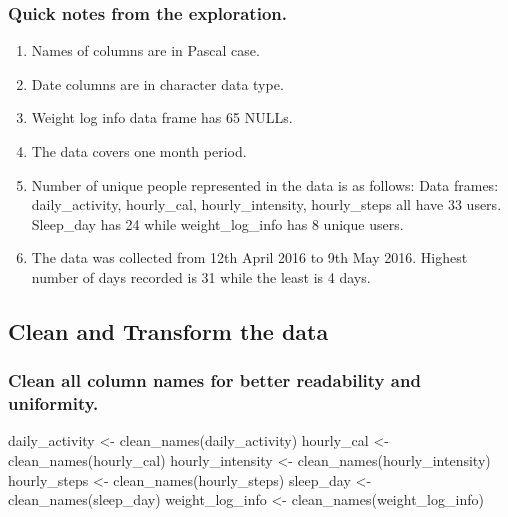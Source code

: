 \documentclass[
]{article}
\newenvironment{Shaded}{\begin{snugshade}}{\end{snugshade}}
\newcommand{\FunctionTok}[1]{\textcolor[rgb]{0.00,0.00,0.00}{#1}}
\newcommand{\NormalTok}[1]{#1}
\newcommand{\OtherTok}[1]{\textcolor[rgb]{0.56,0.35,0.01}{#1}}
\begin{document}
\hypertarget{quick-notes-from-the-exploration.}{%
\subsubsection{Quick notes from the
exploration.}\label{quick-notes-from-the-exploration.}}

\begin{enumerate}
\def\labelenumi{\arabic{enumi}.}
\item
  Names of columns are in Pascal case.
\item
  Date columns are in character data type.
\item
  Weight log info data frame has 65 NULLs.
\item
  The data covers one month period.
\item
  Number of unique people represented in the data is as follows: Data
  frames: daily\_activity, hourly\_cal, hourly\_intensity, hourly\_steps
  all have 33 users. Sleep\_day has 24 while weight\_log\_info has 8
  unique users.
\item
  The data was collected from 12th April 2016 to 9th May 2016. Highest
  number of days recorded is 31 while the least is 4 days.
\end{enumerate}

\hypertarget{clean-and-transform-the-data}{%
\subsection{Clean and Transform the
data}\label{clean-and-transform-the-data}}

\hypertarget{clean-all-column-names-for-better-readability-and-uniformity.}{%
\subsubsection{Clean all column names for better readability and
uniformity.}\label{clean-all-column-names-for-better-readability-and-uniformity.}}

\begin{Shaded}
\begin{Highlighting}[]
\NormalTok{daily\_activity }\OtherTok{\textless{}{-}} \FunctionTok{clean\_names}\NormalTok{(daily\_activity)}
\NormalTok{hourly\_cal }\OtherTok{\textless{}{-}} \FunctionTok{clean\_names}\NormalTok{(hourly\_cal)}
\NormalTok{hourly\_intensity }\OtherTok{\textless{}{-}} \FunctionTok{clean\_names}\NormalTok{(hourly\_intensity)}
\NormalTok{hourly\_steps }\OtherTok{\textless{}{-}} \FunctionTok{clean\_names}\NormalTok{(hourly\_steps)}
\NormalTok{sleep\_day }\OtherTok{\textless{}{-}} \FunctionTok{clean\_names}\NormalTok{(sleep\_day)}
\NormalTok{weight\_log\_info }\OtherTok{\textless{}{-}} \FunctionTok{clean\_names}\NormalTok{(weight\_log\_info)}
\end{Highlighting}
\end{Shaded}
\end{document}
